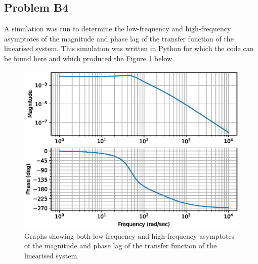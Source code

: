 \subsection*{Problem B4}
    A simulation was run to determine the low-frequency and high-frequency asymptotes of the magnitude and phase lag of the transfer function of the linearised system. This simulation was written in Python for which the code can be found \href{https://github.com/drlim2u/ELE2024-Control-Coursework/blob/059953dc7b2d8ba0a86b6f437153ceb4442b7a60/PartB.py#L125}{here} and which produced the Figure \ref{fig:problem_b4} below.
    \begin{figure}[H]
        \centering
        \includegraphics[width=0.6\linewidth]{figures/problem_b4.eps}
        \caption{Graphs showing both low-frequency and high-frequency asymptotes of the magnitude and phase lag of the transfer function of the linearised system.}
        \label{fig:problem_b4}
    \end{figure}